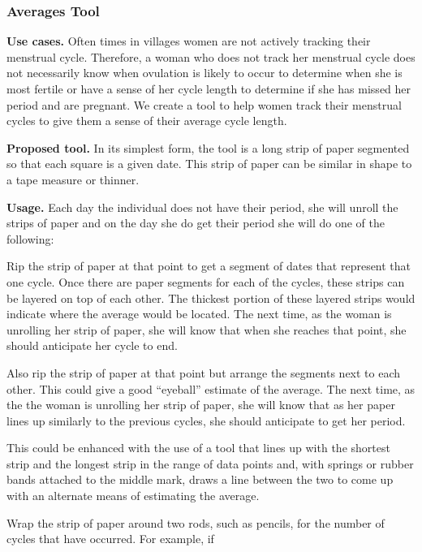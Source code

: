 \documentclass{sig-alternate}
\begin{document}

\subsubsection{Averages Tool}

\textbf{Use cases.} 
Often times in villages women are not actively tracking their menstrual cycle. Therefore, a woman who does not track her menstrual cycle does not necessarily know when ovulation is likely to occur to determine when she is most fertile or have a sense of her cycle length to determine if she has missed her period and are pregnant. We create a tool to help women track their menstrual cycles to give them a sense of their average cycle length.

\textbf{Proposed tool.}
In its simplest form, the tool is a long strip of paper segmented so that each square is a given date. This strip of paper can be similar in shape to a tape measure or thinner.

\textbf{Usage.}
Each day the individual does not have their period, she will unroll the strips of paper and on the day she do get their period she will do one of the following:
\begin{compactitem}

	\item Rip the strip of paper at that point to get a segment of dates that represent that one cycle. Once there are paper segments for each of the cycles, these strips can be layered on top of each other. The thickest portion of these layered strips would indicate where the average would be located. The next time, as the woman is unrolling her strip of paper, she will know that when she reaches that point, she should anticipate her cycle to end.

	\item Also rip the strip of paper at that point but arrange the segments next to each other. This could give a good ``eyeball'' estimate of the average. The next time, as the the woman is unrolling her strip of paper, she will know that as her paper lines up similarly to the previous cycles, she should anticipate to get her period. 

	This could be enhanced with the use of a tool that lines up with the shortest strip and the longest strip in the range of data points and, with springs or rubber bands attached to the middle mark, draws a line between the two to come up with an alternate means of estimating the average.

	\item Wrap the strip of paper around two rods, such as pencils, for the number of cycles that have occurred. For example, if 

\end{compactitem}
\end{document}
